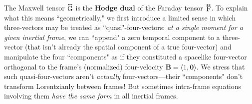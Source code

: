 \documentclass[12pt]{article}
\renewcommand{\vv}[1]{\mathbf{#1}}
\newcommand{\tightoverset}[2]{%
  \mathop{#2}\limits^{\vbox to -.5ex{\kern-0.75ex\hbox{$#1$}\vss}}}
\newcommand{\inlinedy}[1]{\tightoverset{\text{\tiny$\bm\leftrightarrow$}}{#1}}
\begin{document}
The Maxwell tensor $\inlinedy{\mathrm{G}}$ is the \textbf{Hodge dual} of the Faraday tensor $\inlinedy{\mathrm{F}}$. To explain what this means ``geometrically," we first introduce a limited sense in which three-vectors may be treated as ``quasi"-four-vectors: \emph{at a single moment for a given inertial frame}, we can ``append" a zero temporal component to a three-vector (that isn't already the spatial component of a true four-vector) and manipulate the four ``components" as if they constituted a spacelike four-vector orthogonal to the frame's (normalized) four-velocity $\vv B = \langle 1, \vv 0 \rangle$. We stress that such quasi-four-vectors aren't \emph{actually} four-vectors---their ``components" don't transform Lorentzianly between frames! But sometimes intra-frame equations involving them \emph{have the same form} in all inertial frames.
\end{document}
